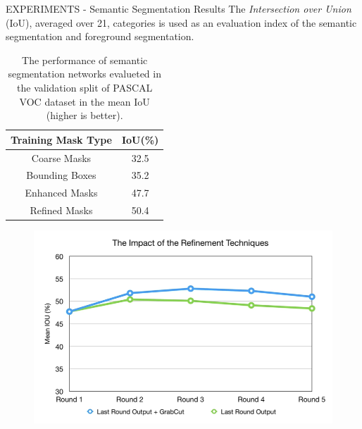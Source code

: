 \begin{frame}{EXPERIMENTS - Semantic Segmentation Results}
    The \emph{Intersection over Union} (IoU), averaged over 21, categories is used as an 
    evaluation index of the semantic segmentation and foreground segmentation. 
    \begin{minipage}{\linewidth}
        \centering
        \begin{minipage}{0.45\linewidth}
            \begin{table}[h!]
                \centering
                \begin{adjustbox}{max width=0.7\textwidth}
                \begin{tabular}{|c|c|}
                    \hline
                    Training Mask Type & IoU(\%)\\
                    \hline
                    Coarse Masks & 32.5 \\
                    Bounding Boxes & 35.2 \\
                    Enhanced Masks & 47.7 \\
                    Refined Masks & 50.4 \\
                    \hline
                \end{tabular}
                \end{adjustbox}
                \caption{The performance of semantic segmentation networks evalueted in the validation split of PASCAL VOC dataset in the mean IoU (higher is better).}
            \end{table}
        \end{minipage}
        \hspace{0.05\linewidth}
        \begin{minipage}{0.45\linewidth}
            \begin{figure}[h!]
                \centering
                \includegraphics[width = 1 \linewidth]{images/paper6/GrabCut.png}

\end{figure}
\end{minipage}
\end{minipage}
\end{frame}
